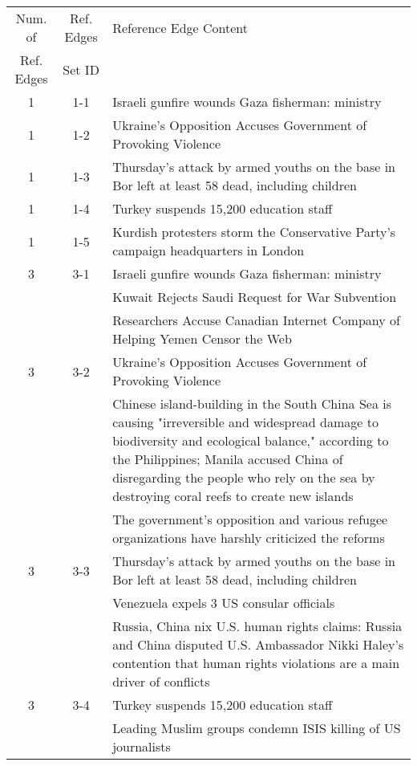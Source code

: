 \begin{table}[H]
\begin{tabular}{cc p{10cm}}
\toprule
\multicolumn{1}{c}{Num. of}			& \multicolumn{1}{c}{Ref. Edges}		& \multicolumn{1}{l}{Reference Edge Content} \\
\multicolumn{1}{c}{Ref. Edges}		& \multicolumn{1}{c}{Set ID}			& \multicolumn{1}{c}{} \\
\midrule
1 & 1-1 & Israeli gunfire wounds Gaza fisherman: ministry \\
\hline
1 & 1-2 & Ukraine’s Opposition Accuses Government of Provoking Violence \\
\hline
1 & 1-3 & Thursday's attack by armed youths on the base in Bor left at least 58 dead, including children \\
\hline
1 & 1-4 & Turkey suspends 15,200 education staff \\
\hline
1 & 1-5 & Kurdish protesters storm the Conservative Party's campaign headquarters in London \\
\hline
3 & 3-1 & Israeli gunfire wounds Gaza fisherman: ministry \\
 &  & Kuwait Rejects Saudi Request for War Subvention \\
 &  & Researchers Accuse Canadian Internet Company of Helping Yemen Censor the Web \\
\hline
3 & 3-2 & Ukraine’s Opposition Accuses Government of Provoking Violence \\
 &  & Chinese island-building in the South China Sea is causing "irreversible and widespread damage to biodiversity and ecological balance," according to the Philippines; Manila accused China of disregarding the people who rely on the sea by destroying coral reefs to create new islands \\
 &  & The government's opposition and various refugee organizations have harshly criticized the reforms \\
\hline
3 & 3-3 & Thursday's attack by armed youths on the base in Bor left at least 58 dead, including children \\
 &  & Venezuela expels 3 US consular officials \\
 &  & Russia, China nix U.S. human rights claims: Russia and China disputed U.S. Ambassador Nikki Haley's contention that human rights violations are a main driver of conflicts \\
\hline
3 & 3-4 & Turkey suspends 15,200 education staff \\
 &  & Leading Muslim groups condemn ISIS killing of US journalists \\

\end{tabular}
\end{table}
